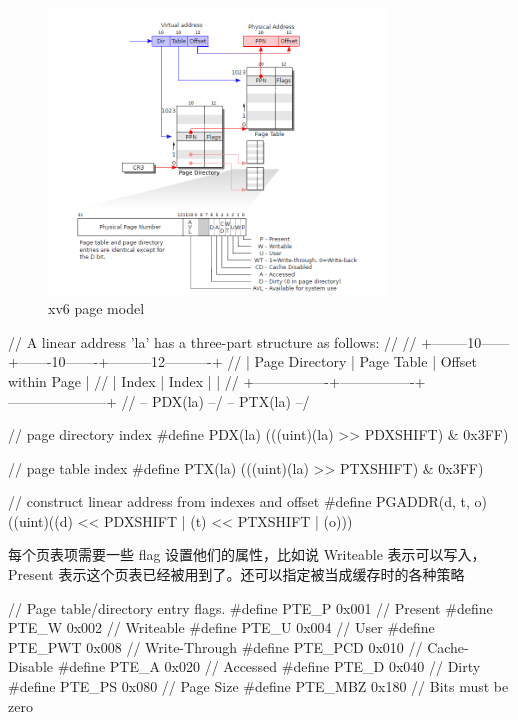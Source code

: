 \begin{figure}[h]
    \centering
    \includegraphics[width=0.8\textwidth]{img/pagemodel.PNG}
    \caption{xv6 page model}
    \label{fig:1}
\end{figure}


\begin{ccode}
    // A linear address 'la' has a three-part structure as follows:
    //
    // +--------10------+-------10-------+---------12----------+
    // | Page Directory |   Page Table   | Offset within Page  |
    // |      Index     |      Index     |                     |
    // +----------------+----------------+---------------------+
    //  \--- PDX(la) --/ \--- PTX(la) --/
        
    // page directory index
    #define PDX(la)		(((uint)(la) >> PDXSHIFT) & 0x3FF)
        
    // page table index
    #define PTX(la)		(((uint)(la) >> PTXSHIFT) & 0x3FF)
        
    // construct linear address from indexes and offset
    #define PGADDR(d, t, o)	((uint)((d) << PDXSHIFT | (t) << PTXSHIFT | (o)))
\end{ccode}

每个页表项需要一些 flag 设置他们的属性，比如说 Writeable 表示可以写入，Present 表示这个页表已经被用到了。还可以指定被当成缓存时的各种策略


\begin{ccode}
    // Page table/directory entry flags.
    #define PTE_P		0x001	// Present
    #define PTE_W		0x002	// Writeable
    #define PTE_U		0x004	// User
    #define PTE_PWT		0x008	// Write-Through
    #define PTE_PCD		0x010	// Cache-Disable
    #define PTE_A		0x020	// Accessed
    #define PTE_D		0x040	// Dirty
    #define PTE_PS		0x080	// Page Size
    #define PTE_MBZ		0x180	// Bits must be zero
\end{ccode}

